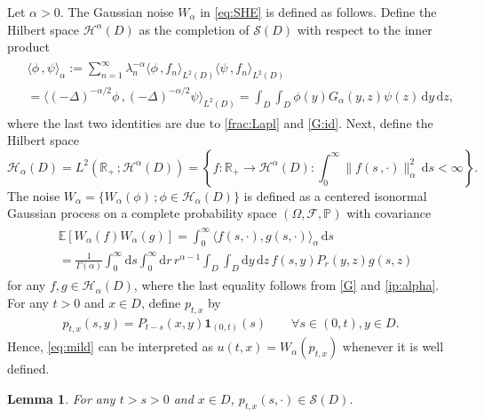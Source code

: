 \documentclass[reqno]{amsart}
\newcommand{\R}{\mathbb R}
\newcommand{\E}{\mathbb E}
\renewcommand{\P}{\mathbb P}
\renewcommand{\d}{\mathrm d}
\newcommand{\1}{\mathbf 1}
\numberwithin{equation}{section}
\newtheorem{lemma}[theorem]{Lemma}
\theoremstyle{definition}
\begin{document}
Let $\alpha > 0$.
The Gaussian noise $W_\alpha$ in \eqref{eq:SHE} is defined as follows.
Define the Hilbert space $\mathcal{H}^\alpha(D)$ as the completion of $\mathcal{S}(D)$ with respect to the inner product
\begin{align}\begin{split}\label{ip:alpha}
    &\langle \phi\,, \psi \rangle_{\alpha}
    := \sum_{n=1}^\infty \lambda_n^{-\alpha} \langle \phi\,, f_n \rangle_{L^2(D)} \langle \psi\,, f_n \rangle_{L^2(D)}\\
    &= \big\langle (-\Delta)^{-\alpha/2} \phi\,, (-\Delta)^{-\alpha/2} \psi \big\rangle_{L^2(D)}
    = \int_D \int_D \phi(y) G_{\alpha}(y,z) \psi(z) \, \d y \, \d z,
\end{split}\end{align}
where the last two identities are due to \eqref{frac:Lapl} and \eqref{G:id}.
Next, define the Hilbert space
\begin{equation*}\label{eq:Hilbertspace}
    \mathcal{H}_{\alpha}(D) = L^2(\R_+\,; \mathcal{H}^{\alpha}(D)) = \left\{ f: \R_+ \to \mathcal{H}^\alpha(D) : \int_0^\infty \|f(s\,,\cdot)\|_{\alpha}^2\, \d s < \infty \right\}.
\end{equation*}
The noise $W_\alpha =\{ W_{\alpha}(\phi)\,; \phi \in \mathcal{H}_{\alpha}(D) \}$ is defined as a centered isonormal Gaussian process on a complete probability space $(\Omega, \mathcal{F}, \P)$ with covariance
\begin{align}\begin{split}\label{W:corr:WfWg}
    &\E[W_{\alpha}(f)W_{\alpha}(g)] = \int_0^\infty \langle f(s,\cdot), g(s,\cdot) \rangle_{\alpha} \, \d s\\
    &= \frac{1}{\Gamma(\alpha)} \int_0^\infty \d s \int_0^\infty \d r \, r^{\alpha-1} \int_D \int_D \d y\, \d z \, f(s,y) P_r(y,z) g(s,z)
\end{split}\end{align}
for any $f, g \in \mathcal{H}_\alpha(D)$, where the last equality follows from \eqref{G} and \eqref{ip:alpha}.
For any $t>0$ and $x \in D$, define $p_{t,x}$ by
\begin{align}\label{p}
    p_{t,x}(s,y) = P_{t-s}(x,y) \1_{(0,t)}(s) \qquad \forall s \in (0,t), y \in D.
\end{align}
Hence, \eqref{eq:mild} can be interpreted as $u(t,x) = W_\alpha(p_{t,x})$ whenever it is well defined.

\begin{lemma}\label{lem:p:S(D)}
For any $t>s>0$ and $x \in D$, $p_{t,x}(s,\cdot) \in \mathcal{S}(D)$.
\end{lemma}
\end{document}
